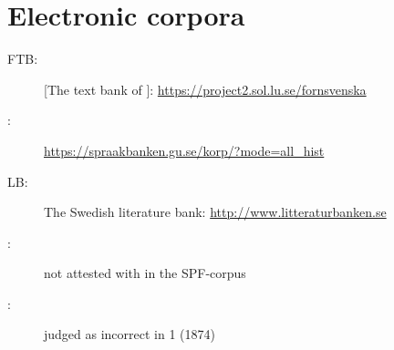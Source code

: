 \documentclass[output=paper]{langscibook}
\begin{document}
\section*{Electronic corpora}

\begin{description}
\item[FTB:]  [The text bank of ]: \url{https://project2.sol.lu.se/fornsvenska} 
\item[:] \url{https://spraakbanken.gu.se/korp/?mode=all_hist}
\item[LB:] The Swedish literature bank: \url{http://www.litteraturbanken.se}
\end{description}



\label{falk:appendix:1}\largerpage[2]

\begin{description}
\item[\normalfont *:] not attested with  in the SPF-corpus
\item[\normalfont {}:]  judged as incorrect in  1 (1874)
\end{description}
\end{document}
